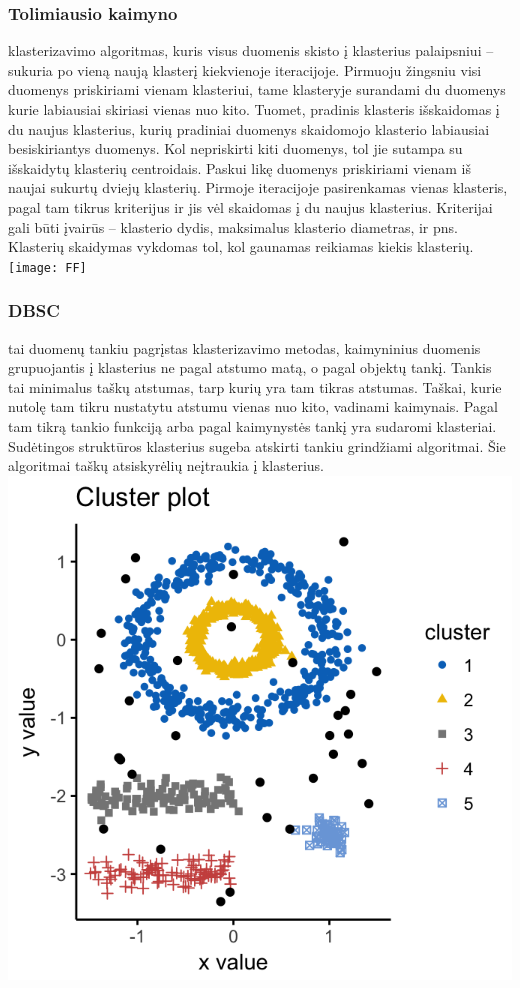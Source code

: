 \documentclass{VUMIFInfKursinis}
\begin{document}
\subsubsection{Tolimiausio kaimyno}
klasterizavimo algoritmas, kuris visus duomenis skisto į klasterius palaipsniui – sukuria po vieną naują klasterį kiekvienoje iteracijoje. Pirmuoju žingsniu visi duomenys priskiriami vienam klasteriui, tame klasteryje surandami du duomenys kurie labiausiai skiriasi vienas nuo kito. Tuomet, pradinis klasteris išskaidomas į du naujus klasterius, kurių pradiniai duomenys skaidomojo klasterio labiausiai besiskiriantys duomenys. Kol nepriskirti kiti duomenys, tol jie sutampa su išskaidytų klasterių centroidais. Paskui likę duomenys priskiriami vienam iš naujai sukurtų dviejų klasterių. Pirmoje iteracijoje pasirenkamas vienas klasteris, pagal tam tikrus kriterijus ir jis vėl skaidomas į du naujus klasterius. Kriterijai gali būti įvairūs – klasterio dydis, maksimalus klasterio diametras, ir pns. Klasterių skaidymas vykdomas tol, kol gaunamas reikiamas kiekis klasterių.\\
\texttt{[image: FF]}

\subsubsection{DBSC}
 tai duomenų tankiu pagrįstas klasterizavimo metodas, kaimyninius duomenis grupuojantis į klasterius ne pagal atstumo matą, o pagal objektų tankį. Tankis tai minimalus taškų atstumas, tarp kurių yra tam tikras atstumas. Taškai, kurie nutolę tam tikru nustatytu atstumu vienas nuo kito, vadinami kaimynais. Pagal tam tikrą tankio funkciją arba pagal kaimynystės tankį yra sudaromi klasteriai. Sudėtingos struktūros klasterius sugeba atskirti tankiu grindžiami algoritmai. Šie algoritmai taškų atsiskyrėlių neįtraukia į klasterius.
\includegraphics{DBSCAN}
\end{document}
